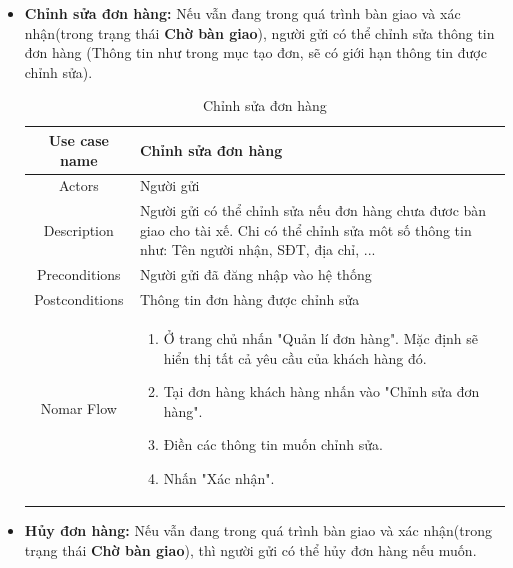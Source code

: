 \begin{itemize}
\begin{itemize}
			\newpage
			
			\item \textbf{Chỉnh sửa đơn hàng:} Nếu vẫn đang trong quá trình bàn giao và xác nhận(trong trạng thái \textbf{Chờ bàn giao}), người gửi có thể chỉnh sửa thông tin đơn hàng (Thông tin như trong mục tạo đơn, sẽ có giới hạn thông tin được chỉnh sửa).
			
			\begin{table}[!htp]
				\centering\begin{tabular}{|c|m{25em}|}
					\hline 
					Use case name & Chỉnh sửa đơn hàng\\ 
					\hline 
					Actors & Người gửi \\ 
					\hline
					Description & Người gửi có thể chỉnh sửa nếu đơn hàng chưa đươc bàn giao cho tài xế. Chi có thể chỉnh sửa môt số thông tin như: Tên người nhận, SĐT, địa chỉ, ... \\
					\hline 
					Preconditions & Người gửi đã đăng nhập vào hệ thống \\
					\hline
					Postconditions & Thông tin đơn hàng được chỉnh sửa \\
					\hline
					Nomar Flow & \begin{enumerate}
						\item Ở trang chủ nhấn "Quản lí đơn hàng". Mặc định sẽ hiển thị tất cả yêu cầu của khách hàng đó.
						\item Tại đơn hàng khách hàng nhấn vào "Chỉnh sửa đơn hàng".
						\item Điền các thông tin muốn chỉnh sửa.
						\item Nhấn "Xác nhận".
					\end{enumerate}
					\\
					\hline
				\end{tabular}
				\caption{Chỉnh sửa đơn hàng}
			\end{table}
			
			\item \textbf{Hủy đơn hàng:} Nếu vẫn đang trong quá trình bàn giao và xác nhận(trong trạng thái \textbf{Chờ bàn giao}), thì người gửi có thể hủy đơn hàng nếu muốn.
			

\end{itemize}
\end{itemize}
